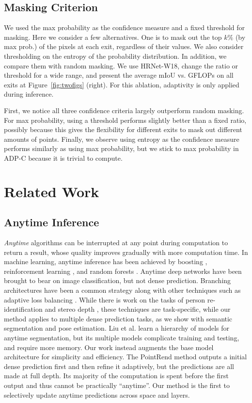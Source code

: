 \subsection{Masking Criterion}
We used the max probability as the confidence measure and a fixed threshold for masking.
Here we consider a few alternatives.
One is to mask out the top $k\%$ (by max prob.) of the pixels at each exit, regardless of their values.
We also consider thresholding on the entropy of the probability distribution.
In addition, we compare them with random masking.
We use HRNet-W18, change the ratio or threshold for a wide range, and present the average mIoU vs. GFLOPs on all exits at Figure~\ref{fig:twofigs} (right). 
For this ablation, adaptivity is only applied during inference.


First, we notice all three confidence criteria largely outperform random masking.
For max probability, using a threshold performs slightly better than a fixed ratio, possibly because this gives the flexibility for different exits to mask out different amounts of points.
Finally, we observe using entropy as the confidence measure performs similarly as using max probability, but we stick to max probability in ADP-C because it is trivial to compute.

\section{Related Work}
\subsection{Anytime Inference} 
\emph{Anytime} algorithms \cite{zilberstein1996using,dean1988analysis} can be interrupted at any point during computation to return a result, whose quality improves gradually with more computation time.
In machine learning, anytime inference has been achieved by boosting \cite{grubb2012speedboost}, reinforcement learning \cite{karayev2014anytime}, and random forests \cite{frohlich2012time}.
Anytime deep networks have been brought to bear on image classification, but not dense prediction.
Branching architectures have been a common strategy \cite{amthor2016impatient,teerapittayanon2016branchynet} along with other techniques such as
adaptive loss balancing \cite{hu2019learning}.
While there is work on the tasks of person re-identification \cite{wang2019anytime} and stereo depth \cite{wang2018resource}, these techniques are task-specific, while our method applies to multiple dense prediction tasks, as we show with semantic segmentation and pose estimation.
Liu et al. \cite{liu2016learning} learn a hierarchy of models for anytime segmentation, but its multiple models complicate training and testing, and require more memory. 
Our work instead augments the base model architecture for simplicity and efficiency. The PointRend method \cite{kirillov2020pointrend} outputs a initial dense prediction first and then refine it adaptively, but the predictions are all made at full depth. Its majority of the computation is spent before the first output and thus cannot be practically ``anytime''.
Our method is the first to selectively update anytime predictions across space and layers.


